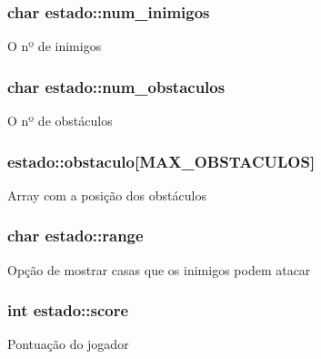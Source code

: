 \subsubsection[{\texorpdfstring{num\+\_\+inimigos}{num_inimigos}}]{\setlength{\rightskip}{0pt plus 5cm}char estado\+::num\+\_\+inimigos}\hypertarget{structestado_a6fbc4a80c4f371036f264ecfe27e5f9e}{}\label{structestado_a6fbc4a80c4f371036f264ecfe27e5f9e}
O nº de inimigos 
\subsubsection[{\texorpdfstring{num\+\_\+obstaculos}{num_obstaculos}}]{\setlength{\rightskip}{0pt plus 5cm}char estado\+::num\+\_\+obstaculos}\hypertarget{structestado_ac1a8a541e2301189833c6f713c416063}{}\label{structestado_ac1a8a541e2301189833c6f713c416063}
O nº de obstáculos 
\subsubsection[{\texorpdfstring{obstaculo}{obstaculo}}]{ estado\+::obstaculo\mbox{[}{\bf M\+A\+X\+\_\+\+O\+B\+S\+T\+A\+C\+U\+L\+OS}\mbox{]}}\hypertarget{structestado_a970dc20c6687acb17c3f08c06edbed4f}{}\label{structestado_a970dc20c6687acb17c3f08c06edbed4f}
Array com a posição dos obstáculos 
\subsubsection[{\texorpdfstring{range}{range}}]{\setlength{\rightskip}{0pt plus 5cm}char estado\+::range}\hypertarget{structestado_a813cb0f2927179b6139566f846c77018}{}\label{structestado_a813cb0f2927179b6139566f846c77018}
Opção de mostrar casas que os inimigos podem atacar 
\subsubsection[{\texorpdfstring{score}{score}}]{\setlength{\rightskip}{0pt plus 5cm}int estado\+::score}\hypertarget{structestado_a47e99ef4241dfe72d9d68244a68adb46}{}\label{structestado_a47e99ef4241dfe72d9d68244a68adb46}
Pontuação do jogador 
